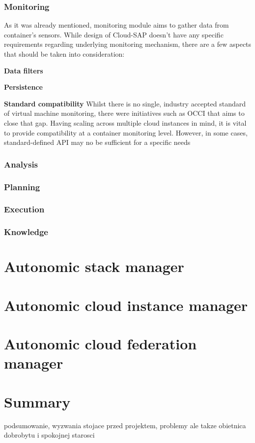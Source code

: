 \subsubsection{Monitoring}
As it was already mentioned, monitoring module aims to gather data from container's sensors. While design of Cloud-SAP doesn't have any specific requirements regarding underlying monitoring mechanism, there are a few aspects that should be taken into consideration:
\begin{asparaenum}
  \item[\textbf{Data filters}]

  \item[\textbf{Persistence}]

  \item[\textbf{Standard compatibility}] Whilst there is no single, industry accepted standard of virtual machine monitoring, there were initiatives such as OCCI \cite{OCCI} that aims to close that gap. Having scaling across multiple cloud instances in mind, it is vital to provide compatibility at a container monitoring level. However, in some cases, standard-defined API may no be sufficient for a specific needs  
\end{asparaenum}


\subsubsection{Analysis}
\subsubsection{Planning}
\subsubsection{Execution}
\subsubsection{Knowledge}

\section{Autonomic stack manager}

\section{Autonomic cloud instance manager}

\section{Autonomic cloud federation manager}

\section{Summary}
podsumowanie, wyzwania stojace przed projektem, problemy ale takze obietnica dobrobytu i spokojnej starosci
